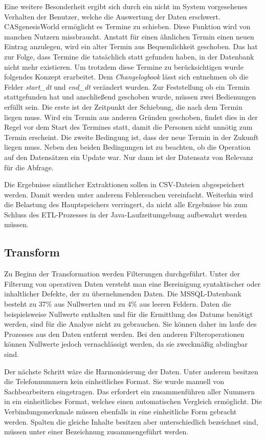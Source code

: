 Eine weitere Besonderheit ergibt sich durch ein nicht im System vorgesehenes Verhalten der Benutzer, welche die Auswertung der Daten erschwert. CASgenesisWorld ermöglicht es Termine zu schieben. Diese Funktion wird von manchen Nutzern missbraucht. Anstatt für einen ähnlichen Termin einen neuen Eintrag anzulegen, wird ein alter Termin aus Bequemlichkeit geschoben. Das hat zur Folge, dass Termine die tatsächlich statt gefunden haben, in der Datenbank nicht mehr existieren. Um trotzdem diese Termine zu berücksichtigen wurde folgendes Konzept erarbeitet. Dem \textit{Changelogbook} lässt sich entnehmen ob die Felder \textit{start\_dt} und \textit{end\_dt} verändert wurden. Zur Feststellung ob ein Termin stattgefunden hat und anschließend geschoben wurde, müssen zwei Bedienungen erfüllt sein. 
Die erste ist der Zeitpunkt der Schiebung, die nach dem Termin liegen muss. Wird ein Termin aus anderen Gründen geschoben, findet dies in der Regel vor dem Start des Termines statt, damit die Personen nicht unnötig zum Termin erscheint. Die zweite Bedingung ist, dass der neue Termin in der Zukunft liegen muss. Neben den beiden Bedingungen ist zu beachten, ob die Operation auf den Datensätzen ein Update war. Nur dann ist der Datensatz von Relevanz für die Abfrage. 

Die Ergebnisse sämtlicher Extraktionen sollen in CSV-Dateien abgespeichert werden. Damit werden unter anderem Fehlersuchen vereinfacht. Weiterhin wird die Belastung des Hauptspeichers verringert, da nicht alle Ergebnisse bis zum Schluss des ETL-Prozesses in der Java-Laufzeitumgebung aufbewahrt werden müssen.

\subsection{Transform}

Zu Beginn der Transformation werden Filterungen durchgeführt. Unter der Filterung von operativen Daten versteht man eine Bereinigung syntaktischer oder inhaltlicher Defekte, der zu übernehmenden Daten. Die MSSQL-Datenbank besteht zu 37\% aus Nullwerten und zu 4\% aus leeren Feldern. Daten die beispielsweise Nullwerte enthalten und für die Ermittlung des Datums benötigt werden, sind für die Analyse nicht zu gebrauchen. Sie können daher im laufe des Prozesses aus den Daten entfernt werden. Bei den anderen Filteroperationen können Nullwerte jedoch vernachlässigt werden, da sie zweckmäßig abdingbar sind.

Der nächste Schritt wäre die Harmonisierung der Daten. Unter anderem besitzen die Telefonnummern kein einheitliches Format. Sie wurde manuell von Sachbearbeitern eingetragen. Das erfordert ein zusammenführen aller Nummern in ein einheitliches Format, welches einen automatischen Vergleich ermöglicht. Die Verbindungsmerkmale müssen ebenfalls in eine einheitliche Form gebracht werden. Spalten die gleiche Inhalte besitzen aber unterschiedlich bezeichnet sind, müssen unter einer Bezeichnung zusammengeführt werden. 

